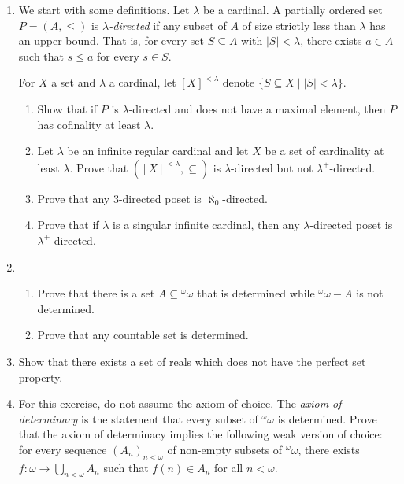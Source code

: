 \documentclass{amsart}
\theoremstyle{definition}
\newcommand{\seq}[2]{\left(#1\right)_{#2}}
\newcommand{\fct}[2]{{}^{#1} {#2}}
\begin{document}
\begin{enumerate}
\item We start with some definitions. Let $\lambda$ be a cardinal. A partially ordered set $P = (A, \le)$ is \emph{$\lambda$-directed} if any subset of $A$ of size strictly less than $\lambda$ has an upper bound. That is, for every set $S \subseteq A$ with $|S| < \lambda$, there exists $a \in A$ such that $s \le a$ for every $s \in S$.

  For $X$ a set and $\lambda$ a cardinal, let $[X]^{<\lambda}$ denote $\{S \subseteq X \mid |S| < \lambda\}$.

  \begin{enumerate}
  \item Show that if $P$ is $\lambda$-directed and does not have a maximal element, then $P$ has cofinality at least $\lambda$. 
  \item Let $\lambda$ be an infinite regular cardinal and let $X$ be a set of cardinality at least $\lambda$. Prove that $([X]^{<\lambda}, \subseteq)$ is $\lambda$-directed but not $\lambda^+$-directed.
  \item Prove that any $3$-directed poset is $\aleph_0$-directed.
  \item Prove that if $\lambda$ is a singular infinite cardinal, then any $\lambda$-directed poset is $\lambda^+$-directed.
  \end{enumerate}
\item
  \begin{enumerate}
  \item Prove that there is a set $A \subseteq \fct{\omega}{\omega}$ that is determined while $\fct{\omega}{\omega} - A$ is not determined.
  \item Prove that any countable set is determined.
  \end{enumerate}
\item Show that there exists a set of reals which does not have the perfect set property.
\item For this exercise, do not assume the axiom of choice. The \emph{axiom of determinacy} is the statement that every subset of $\fct{\omega}{\omega}$ is determined. Prove that the axiom of determinacy implies the following weak version of choice: for every sequence $\seq{A_n}{n < \omega}$ of non-empty subsets of $\fct{\omega}{\omega}$, there exists $f: \omega \to \bigcup_{n < \omega} A_n$ such that $f (n) \in A_n$ for all $n < \omega$.
\end{enumerate}
\end{document}
